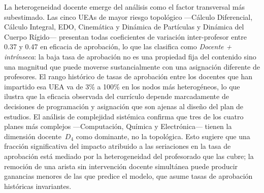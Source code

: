\documentclass[11pt,letterpaper]{article}
\begin{document}
La heterogeneidad docente emerge del análisis como el factor transversal más subestimado.
Las cinco UEAs de mayor riesgo topológico ---Cálculo Diferencial, Cálculo Integral, EDO,
Cinemática y Dinámica de Partículas y Dinámica del Cuerpo Rígido--- presentan todas
coeficientes de variación inter-profesor entre 0.37 y 0.47 en eficacia de aprobación, lo que
las clasifica como \emph{Docente + intrínseca}: la baja tasa de aprobación no es una
propiedad fija del contenido sino una magnitud que puede moverse sustancialmente con una
asignación diferente de profesores.
El rango histórico de tasas de aprobación entre los docentes que han impartido esa UEA
va de 3\% a 100\% en los nodos más heterogéneos, lo que ilustra que la eficacia
observada del currículo depende marcadamente de decisiones de programación y asignación
que son ajenas al diseño del plan de estudios.
El análisis de complejidad sistémica confirma que tres de los cuatro planes más complejos
---Computación, Química y Electrónica--- tienen la dimensión docente~$D_4$ como dominante,
no la topológica.
Esto sugiere que una fracción significativa del impacto atribuido a las seriaciones en la
tasa de aprobación está mediado por la heterogeneidad del profesorado que las cubre; la
remoción de una arista sin intervención docente simultánea puede producir ganancias menores
de las que predice el modelo, que asume tasas de aprobación históricas invariantes.
\end{document}
